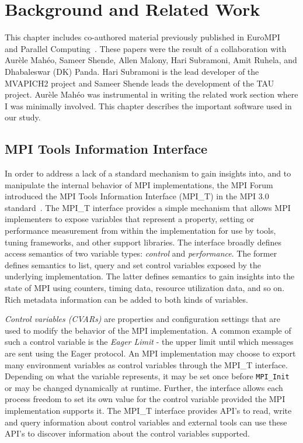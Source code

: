 \chapter{Background and Related Work}
This chapter includes co-authored material previously published in EuroMPI~\cite{EuroMPI} and Parallel Computing~\cite{ParCo}. These papers were the result of a collaboration with Aur\`{e}le Mah\'{e}o, Sameer Shende, Allen Malony, Hari Subramoni, Amit Ruhela, and Dhabaleswar (DK) Panda. Hari Subramoni is the lead developer of the MVAPICH2 project and Sameer Shende leads the development of the TAU project. Aur\`{e}le Mah\'{e}o was instrumental in writing the related work section where I was minimally involved. This chapter describes the important software used in our study. 
\section{MPI Tools Information Interface}
In order to address a lack of a standard mechanism to gain insights into, and to manipulate the internal behavior of MPI implementations, the MPI Forum introduced the MPI Tools Information Interface (MPI\_T) in the MPI 3.0 standard~\cite{MPI_3_1}. The MPI\_T interface provides a simple mechanism that allows MPI implementers to expose variables that represent a property, setting or performance measurement from within the implementation for use by tools, tuning frameworks, and other support libraries. The interface broadly defines access semantics of two variable types: \textit{control} and \textit{performance}. The former defines semantics to list, query and set control variables exposed by the underlying implementation. The latter defines semantics to gain insights into the state of MPI using counters, timing data, resource utilization data, and so on. Rich metadata information can be added to both kinds of variables. \par
\textit{Control variables (CVARs)} are properties and configuration settings that are used to modify the behavior of the MPI implementation. A common example of such a control variable is the \emph{Eager Limit} - the upper limit until which messages are sent using the Eager protocol. An MPI implementation may choose to export many environment variables as control variables through the MPI\_T interface. Depending on what the variable represents, it may be set once before \verb+MPI_Init+ or may be changed dynamically at runtime. Further, the interface allows each process freedom to set its own value for the control variable provided the MPI implementation supports it. The MPI\_T interface provides API's to read, write and query information about control variables and external tools can use these API's to discover information about the control variables supported. \par

